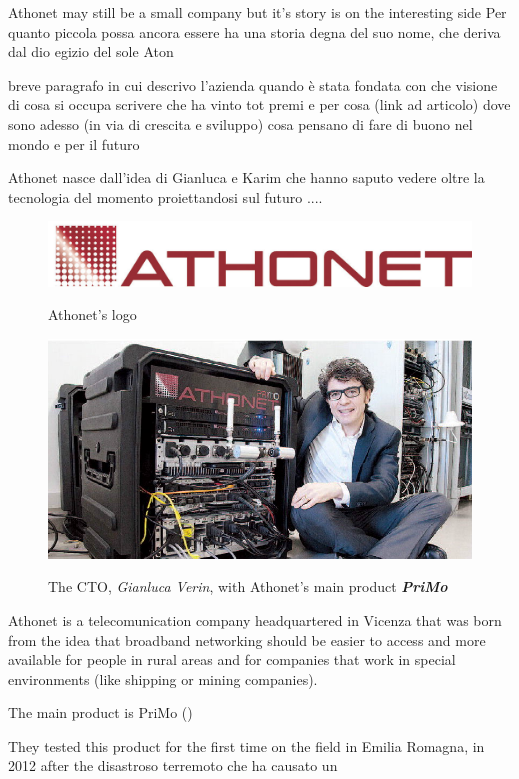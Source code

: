 	Athonet may still be a small company but it's story is on the interesting side
	Per quanto piccola possa ancora essere ha una storia degna del suo nome, che deriva dal dio egizio del sole Aton

	breve paragrafo in cui descrivo l'azienda
	quando è stata fondata
	con che visione
	di cosa si occupa
	scrivere che ha vinto tot premi e per cosa (link ad articolo)
	dove sono adesso (in via di crescita e sviluppo)
	cosa pensano di fare di buono nel mondo e per il futuro
	
	Athonet nasce dall'idea di Gianluca e Karim che hanno saputo vedere oltre la tecnologia del momento proiettandosi sul futuro ....
	
	\begin{figure}[H]
		\centering
		\includegraphics[width=.7\textwidth]{resources/ath_logo}\\
		\caption{Athonet's logo}
	\end{figure}
	
	\begin{figure}[H]
		\centering
		\includegraphics[width=.7\textwidth]{resources/gianluca_primo}\\
		\caption{The CTO, \textit{Gianluca Verin}, with Athonet's main product \textbf{\textit{PriMo}}}
	\end{figure}
	
	Athonet is a telecomunication company headquartered in Vicenza that was born from the idea that broadband networking should be easier to access and more available for people in rural areas and for companies that work in special environments (like shipping or mining companies).
	
	The main product is PriMo ()
	
	They tested this product for the first time on the field in Emilia Romagna, in 2012 after the disastroso terremoto che ha causato un 
	
